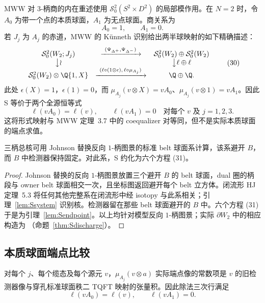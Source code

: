 MWW 对 $3$-柄商的内在重述使用 $\mathcal S^2_0(S^2\times D^2)$ 的局部模作用。在 $N=2$ 时，令 $A_0$ 为带一个点的本质球面，$A_1$ 为无点球面。商关系为
\[
A_0=1,\qquad A_1=0.
\]
若 $J_j$ 为 $A_j$ 的赤道，MWW 的 K\"unneth 识别给出两半球映射的如下精确描述：
\[
\begin{array}{ccc}
\mathcal S^2_0(W_2;J_j)&\xrightarrow{\ (\Psi_{\Delta^+},\Psi_{\Delta^-})\ }&
\mathcal S^2_0(W_2)\oplus\mathcal S^2_0(W_2)\\
\big\downarrow\wr&&\big\downarrow{\ell\oplus\ell}\\
\mathcal S^2_0(W_2)\otimes\Q\{1,X\}
&\xrightarrow{\ (\ell\circ(1\otimes\epsilon),\,\ell\circ\mu_{A_j})\ }&
\Q\oplus\Q.
\end{array}
\tag{30}
\]
此处 $\epsilon(X)=1$，$\epsilon(1)=0$，而 $\mu_{A_j}(v\otimes X)=vA_0$、$\mu_{A_j}(v\otimes1)=vA_1$。因此 S 等价于两个全源恒等式
\[
\ell(vA_0)=\ell(v),\qquad \ell(vA_1)=0
\quad\text{对每个 }v\text{ 及 }j=1,2,3.
\tag{31}
\]
这将形式映射与 MWW 定理~3.7 中的 coequalizer 对等同，但不是实际本质球面的端点求值。

\begin{proposition}[固定检测器的球面替换]\label{thm:Sgeometry}
三柄总核可用 Johnson 替换反向 $1$-柄图景的标准 belt 球面系计算，该系避开 $B$，而 $B$ 中检测器保持固定。对此系，S 约化为六个方程 (31)。
\end{proposition}

\begin{proof}
Johnson 替换的反向 $1$-柄图景放置三个避开 $B$ 的 belt 球面，dual 圈的柄段与 owner belt 球面相交一次，且坐标图返回避开每个 belt 立方体。闭流形 HJ 定理~5.3 将任何其他完整系在闭流形中经 isotopy 与此系相关；引理~\ref{lem:Ssystem}
识别核。检测器留在那些 belt 球面避开的 $B$ 中。六个方程 (31) 于是为引理~\ref{lem:Sendpoint}。以上均针对模型反向 $1$-柄图景；实际 $\partial W_2$ 中的相应构造为 \Open（命题~\ref{thm:Sdischarge}）。
\end{proof}

\subsection{本质球面端点比较}

\begin{lemma}[标准球面的端点分解]\label{lem:Sendpoint}
对每个 \(j\)、每个缆态及每个源元 \(v\)，\(\mu_{A_j}(v\otimes a)\) 实际端点像的常数项是 \(v\) 的旧检测器像与穿孔标准球面秩二 TQFT 映射的张量积。因此除法三次行满足
\[
\ell(vA_0)=\ell(v),\qquad \ell(vA_1)=0.
\]
\end{lemma}

